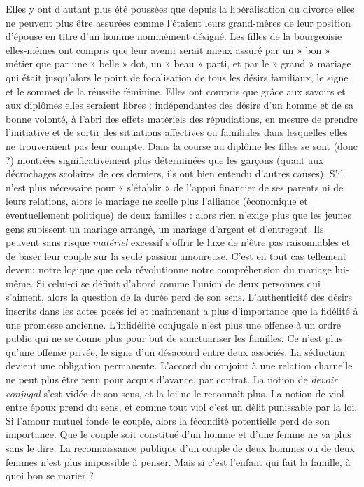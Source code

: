  Elles y ont d'autant plus été poussées que depuis la libéralisation du divorce elles ne peuvent plus être assurées comme l'étaient leurs grand-mères de leur position d'épouse en titre d'un homme nommément désigné. Les filles de la bourgeoisie elles-mêmes ont compris que leur avenir serait mieux assuré par un » bon » métier que par une » belle » dot, un » beau » parti, et par le » grand » mariage qui était jusqu'alors le point de focalisation de tous les désirs familiaux, le signe et le sommet de la réussite féminine. Elles ont compris que grâce aux savoirs et aux diplômes elles seraient libres : indépendantes des désirs d'un homme et de sa bonne volonté, à l'abri des effets matériels des répudiations, en mesure de prendre l'initiative et de sortir des situations affectives ou familiales dans lesquelles elles ne trouveraient pas leur compte. Dans la course au diplôme les filles se sont (donc ?) montrées significativement plus déterminées que les garçons (quant aux décrochages scolaires de ces derniers, ils ont bien entendu d'autres causes). 
 S'il n'est plus nécessaire pour « s'établir » de l'appui financier de ses parents ni de leurs relations, alors le mariage ne scelle plus l'alliance (économique et éventuellement politique) de deux familles : alors rien n'exige plus que les jeunes gens subissent un mariage arrangé, un mariage d'argent et d'entregent. Ils peuvent sans risque \emph{matériel} excessif s'offrir le luxe de n'être pas raisonnables et de baser leur couple sur la seule passion amoureuse.
 C'est en tout cas tellement devenu notre logique que cela révolutionne notre compréhension du mariage lui-même. Si celui-ci se définit d'abord comme l'union de deux personnes qui s'aiment, alors la question de la durée perd de son sens. L'authenticité des désirs inscrits dans les actes posés ici et maintenant a plus d'importance que la fidélité à une promesse ancienne. L'infidélité conjugale n'est plus une offense à un ordre public qui ne se donne plus pour but de sanctuariser les familles. Ce n'est plus qu'une offense privée, le signe d'un désaccord entre deux associés. La séduction devient une obligation permanente. L'accord du conjoint à une relation charnelle ne peut plus être tenu pour acquis d'avance, par contrat. La notion de \emph{devoir conjugal} s'est vidée de son sens, et la loi ne le reconnaît plus. La notion de viol entre époux prend du sens, et comme tout viol c'est un délit punissable par la loi. 
 Si l'amour mutuel fonde le couple, alors la fécondité potentielle perd de son importance. Que le couple soit constitué d'un homme et d'une femme ne va plus sans le dire. La reconnaissance publique d'un couple de deux hommes ou de deux femmes n'est plus impossible à penser. 
 Mais si c'est l'enfant qui fait la famille, à quoi bon se marier ?